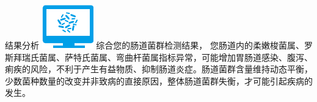 \vspace*{6mm}

\fontsize{9.03pt}{14pt}\selectfont
\begin{LRaside}[.8]{结果分析}
\noindent
\includegraphics[scale=1]{result_fenbu.pdf}
\asidebreak %
综合您的肠道菌群检测结果，
您肠道内的柔嫩梭菌属、罗斯拜瑞氏菌属、萨特氏菌属、弯曲杆菌属指标异常，可能增加胃肠道感染、腹泻、痢疾的风险，不利于产生有益物质、抑制肠道炎症。肠道菌群含量维持动态平衡，少数菌种数量的改变并非致病的直接原因，整体肠道菌群失衡，才可能引起疾病的发生。
\end{LRaside}




